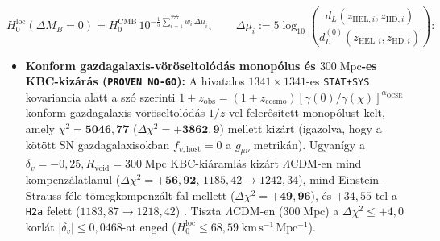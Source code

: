 \documentclass[11pt,a4paper]{article}
\begin{document}
\begin{equation}
  H_0^{\mathrm{loc}}(\Delta M_B = 0) = H_0^{\mathrm{CMB}}\,10^{-\frac{1}{5}\sum_{i=1}^{277} w_i\,\Delta\mu_i}, \qquad \Delta\mu_i := 5\log_{10}\!\left(\frac{d_L(z_{\mathrm{HEL},i}, z_{\mathrm{HD},i})}{d_L^{(0)}(z_{\mathrm{HEL},i}, z_{\mathrm{HD},i})}\right):
\label{eq:windowed-h0}
\end{equation}
\begin{itemize}
  \item \textbf{Konform gazdagalaxis-vöröseltolódás monopólus és $300\;\mathrm{Mpc}$-es KBC-kizárás ({\upshape\texttt{PROVEN NO-GO}}):} A hivatalos $1341\times 1341$-es \texttt{STAT+SYS} kovariancia alatt a szó szerinti $1 + z_{\mathrm{obs}} = (1 + z_{\mathrm{cosmo}})[\gamma(0)/\gamma(\chi)]^{\alpha_{\mathrm{OCSR}}}$ konform gazdagalaxis-vöröseltolódás $1/z$-vel felerősített monopólust kelt, amely $\chi^2 = \mathbf{5046{,}77}$ ($\Delta\chi^2 = \mathbf{+3862{,}9}$) mellett kizárt (igazolva, hogy a kötött SN gazdagalaxisokban $f_{v,\mathrm{host}} = 0$ a $g_{\mu\nu}$ metrikán). Ugyanígy a $\delta_v = -0{,}25, R_{\mathrm{void}} = 300\;\mathrm{Mpc}$ KBC-kiáramlás \cite{Keenan2013KBC,Haslbauer2020KBC} kizárt $\Lambda$CDM-en mind kompenzálatlanul ($\Delta\chi^2 = \mathbf{+56{,}92}$, $1185{,}42 \to 1242{,}34$), mind Einstein--Strauss-féle tömegkompenzált fal mellett ($\Delta\chi^2 = \mathbf{+49{,}96}$), és $+34{,}55$-tel a \texttt{H2a} felett ($1183{,}87 \to 1218{,}42$) \cite{Kenworthy2019LocalVoid}. Tiszta $\Lambda$CDM-en ($300\;\mathrm{Mpc}$) a $\Delta\chi^2 \le +4{,}0$ korlát $|\delta_v| \le 0{,}0468$-at enged ($H_0^{\mathrm{loc}} \le 68{,}59\;\mathrm{km\,s^{-1}\,Mpc^{-1}}$).

\end{itemize}
\end{document}
